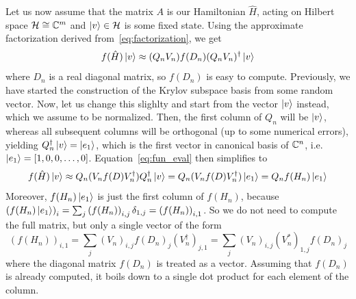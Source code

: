 Let us now assume that the matrix \(A\) is our Hamiltonian \(\hat{H}\), acting on Hilbert space \(\mathcal{H}\cong \mathbb{C}^m\)
and \(\ket{v}\in \mathcal{H}\) is some fixed state.
Using the approximate factorization derived from~\eqref{eq:factorization}, we get
\begin{equation}
	f(\hat{H})\ket{v} \approx (Q_n V_n) f(D_n) (Q_n V_n)^{\dagger} \ket{v} 
	\label{eq:fun_eval}
\end{equation}
where \(D_n\) is a real diagonal matrix, so \(f(D_n)\) is easy to compute.
Previously, we have started the construction of the Krylov subspace basis from some random vector. Now, let us
change this slighlty and start from the vector \(\ket{v}\) instead, which we assume to be normalized. Then,
the first column of \(Q_n\) will be \(\ket{v}\), whereas all subsequent columns will be orthogonal (up to some
numerical errors), yielding \(Q_n^{\dagger}\ket{v} = \ket{e_1}\), which is the first vector in canonical basis
of \( \mathbb{C}^n \), i.e. \( \ket{e_1} = \left[1,0,0,\ldots,0\right] \). Equation~\eqref{eq:fun_eval} then
simplifies to
\begin{equation}
	f(\hat{H}) \ket{v} \approx Q_n (V_n f(D) V_n^{\dagger}) Q_n^{\dagger} \ket{v} = Q_n (V_n f(D) V_n^{\dagger}) \ket{e_1}
	= Q_n f(H_n) \ket{e_1} 
	\label{eq:lanczos_function}
\end{equation}
Moreover, \(f(H_n) \ket{e_1}\) is just the first column of \(f(H_n)\), because \( \left(f(H_n) \ket{e_1}\right)_i =
\sum_j \left(f(H_n)\right)_{i,j} \delta_{1,j} = \left(f(H_n)\right)_{i,1}\). So we do not need to compute the full
matrix, but only a single vector of the form
\begin{equation}
	\left(f(H_n)\right)_{i,1} = \sum_j \left(V_n\right)_{i,j} f(D_n)_j \left(V_n^{\dagger}\right)_{j,1}
	=  \sum_j \left(V_n\right)_{i,j} \left(V_n^{\ast}\right)_{1,j} f(D_n)_j
	\label{eq:c_vector}
\end{equation}
where the diagonal matrix \(f(D_n)\) is treated as a vector. Assuming that \(f(D_n)\) is already computed, it boils
down to a single dot product for each element of the column.

